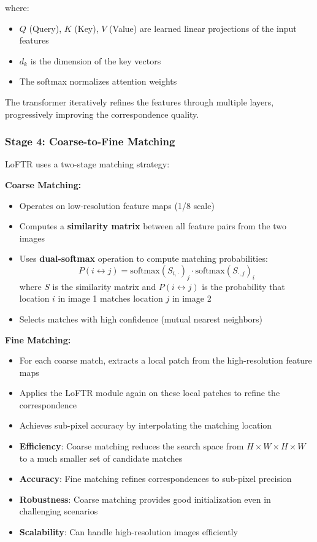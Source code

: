 \documentclass[11pt,a4paper]{article}
\theoremstyle{definition}
\theoremstyle{plain}
\theoremstyle{remark}
\begin{document}
where:
\begin{itemize}
    \item $Q$ (Query), $K$ (Key), $V$ (Value) are learned linear projections of the input features
    \item $d_k$ is the dimension of the key vectors
    \item The softmax normalizes attention weights
\end{itemize}

The transformer iteratively refines the features through multiple layers, progressively improving the correspondence quality.

\subsubsection{Stage 4: Coarse-to-Fine Matching}

LoFTR uses a two-stage matching strategy:

\textbf{Coarse Matching:}
\begin{itemize}
    \item Operates on low-resolution feature maps (1/8 scale)
    \item Computes a \textbf{similarity matrix} between all feature pairs from the two images
    \item Uses \textbf{dual-softmax} operation to compute matching probabilities:
    \[
    P(i \leftrightarrow j) = \text{softmax}(S_{i,\cdot})_j \cdot \text{softmax}(S_{\cdot,j})_i
    \]
    where $S$ is the similarity matrix and $P(i \leftrightarrow j)$ is the probability that location $i$ in image 1 matches location $j$ in image 2
    \item Selects matches with high confidence (mutual nearest neighbors)
\end{itemize}

\textbf{Fine Matching:}
\begin{itemize}
    \item For each coarse match, extracts a local patch from the high-resolution feature maps
    \item Applies the LoFTR module again on these local patches to refine the correspondence
    \item Achieves sub-pixel accuracy by interpolating the matching location
\end{itemize}

\begin{tcolorbox}[colback=green!5!white,colframe=green!75!black,title=\textbf{Coarse-to-Fine Strategy Benefits}]
\begin{itemize}
    \item \textbf{Efficiency}: Coarse matching reduces the search space from $H \times W \times H \times W$ to a much smaller set of candidate matches
    \item \textbf{Accuracy}: Fine matching refines correspondences to sub-pixel precision
    \item \textbf{Robustness}: Coarse matching provides good initialization even in challenging scenarios
    \item \textbf{Scalability}: Can handle high-resolution images efficiently
\end{itemize}
\end{tcolorbox}
\end{document}
